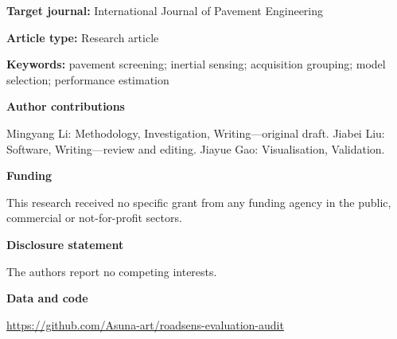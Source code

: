 \documentclass[12pt]{article}
\begin{document}
\singlespacing
\begin{center}
{\Large\bfseries\articletitle\par}\bigskip
\authorblock
\end{center}
\bigskip\noindent\textbf{Target journal:} International Journal of Pavement Engineering\par\medskip
\noindent\textbf{Article type:} Research article\par\medskip
\noindent\textbf{Keywords:} pavement screening; inertial sensing; acquisition grouping; model selection; performance estimation\par\medskip
\noindent\textbf{Author contributions}\par
Mingyang Li: Methodology, Investigation, Writing---original draft. Jiabei Liu: Software, Writing---review and editing. Jiayue Gao: Visualisation, Validation.\par\medskip
\noindent\textbf{Funding}\par
This research received no specific grant from any funding agency in the public, commercial or not-for-profit sectors.\par\medskip
\noindent\textbf{Disclosure statement}\par
The authors report no competing interests.\par\medskip
\noindent\textbf{Data and code}\par
\url{https://github.com/Asuna-art/roadsens-evaluation-audit}
\end{document}
